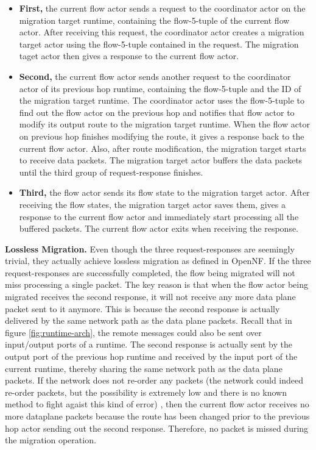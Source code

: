 \begin{itemize}

\item \textbf{First,} the current flow actor sends a request to the coordinator actor on the migration target runtime, containing the flow-5-tuple of the current flow actor. After receiving this request, the coordinator actor creates a migration target actor using the flow-5-tuple contained in the request. The migration taget actor then gives a response to the current flow actor.

\item \textbf{Second,} the current flow actor sends another request to the coordinator actor of its previous hop runtime, containing the flow-5-tuple and the ID of the migration target runtime. The coordinator actor uses the flow-5-tuple to find out the flow actor on the previous hop and notifies that flow actor to modify its output route to the migration target runtime. When the flow actor on previous hop finishes modifying the route, it gives a response back to the current flow actor. Also, after route modification, the migration target starts to receive data packets. The migration target actor buffers the data packets until the third group of request-response finishes.

\item \textbf{Third,} the flow actor sends its flow state to the migration target actor. After receiving the flow states, the migration target actor saves them, gives a response to the current flow actor and immediately start processing all the buffered packets. The current flow actor exits when receiving the response.

\end{itemize}

\textbf{Lossless Migration.} Even though the three request-responses are seemingly trivial, they actually achieve lossless migration as defined in OpenNF. If the three request-responses are successfully completed, the flow being migrated will not miss processing a single packet. The key reason is that when the flow actor being migrated receives the second response, it will not receive any more data plane packet sent to it anymore. This is because the second response is actually delivered by the same network path as the data plane packets. Recall that in figure \ref{fig:runtime-arch}, the remote messages could also be sent over input/output ports of a runtime. The second response is actually sent by the output port of the previous hop runtime and received by the input port of the current runtime, thereby sharing the same network path as the data plane packets. If the network does not re-order any packets (the network could indeed re-order packets, but the possibility is extremely low and there is no known method to fight agaist this kind of error) , then the current flow actor receives no more dataplane packets because the route has been changed prior to the previous hop actor sending out the second response. Therefore, no packet is missed during the migration operation.

